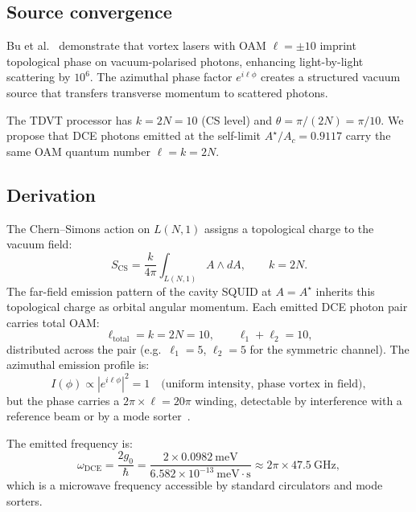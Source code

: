\documentclass[11pt,letterpaper]{article}
\newcommand{\gzero}{g_0}
\newcommand{\AresAc}{A^{\!\star}\!/A_c}
\begin{document}
\subsection{Source convergence}
Bu et al.~\cite{Bu2026} demonstrate that vortex lasers with OAM $\ell = \pm 10$ imprint topological phase on vacuum-polarised photons, enhancing light-by-light scattering by $10^6$.  The azimuthal phase factor $e^{i\ell\phi}$ creates a structured vacuum source that transfers transverse momentum to scattered photons.

The TDVT processor has $k = 2N = 10$ (CS level) and $\theta = \pi/(2N) = \pi/10$.  We propose that DCE photons emitted at the self-limit $\AresAc = 0.9117$ carry the same OAM quantum number $\ell = k = 2N$.

\subsection{Derivation}
The Chern--Simons action on $L(N,1)$ assigns a topological charge to the vacuum field:
\begin{equation}
  S_{\mathrm{CS}} = \frac{k}{4\pi}\int_{L(N,1)} A \wedge dA, \qquad k = 2N.
\end{equation}
The far-field emission pattern of the cavity SQUID at $A = A^{\!\star}$ inherits this topological charge as orbital angular momentum.  Each emitted DCE photon pair carries total OAM:
\begin{equation}\label{eq:oam_dce}
  \ell_{\mathrm{total}} = k = 2N = 10, \qquad \ell_1 + \ell_2 = 10,
\end{equation}
distributed across the pair (e.g.\ $\ell_1 = 5$, $\ell_2 = 5$ for the symmetric channel).
The azimuthal emission profile is:
\begin{equation}
  I(\phi) \propto |e^{i\ell\phi}|^2 = 1 \quad \text{(uniform intensity, phase vortex in field)},
\end{equation}
but the phase carries a $2\pi \times \ell = 20\pi$ winding, detectable by interference with a reference beam or by a mode sorter~\cite{Allen1992}.

The emitted frequency is:
\begin{equation}\label{eq:omega_dce}
  \omega_{\mathrm{DCE}} = \frac{2\gzero}{\hbar} = \frac{2 \times 0.0982~\text{meV}}{6.582 \times 10^{-13}~\text{meV}\cdot\text{s}} \approx 2\pi \times 47.5~\text{GHz},
\end{equation}
which is a microwave frequency accessible by standard circulators and mode sorters.
\end{document}
